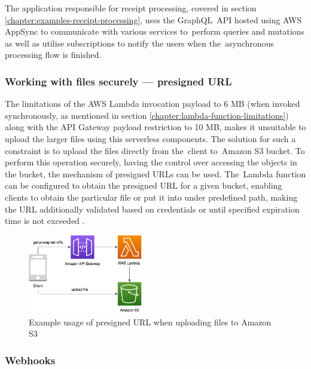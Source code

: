 The application responsible for receipt processing, covered in section \ref{chapter:examples-receipt-processing}, uses the GraphQL~API hosted using AWS AppSync to communicate with various services to~perform queries and mutations as well as utilise subscriptions to notify the users when the~asynchronous processing flow is finished.

\subsubsection{Working with files securely --- presigned URL} \label{chapter:client-presigned-urls}

The limitations of the AWS Lambda invocation payload to 6 MB (when invoked synchronously, as mentioned in section \ref{chapter:lambda-function-limitations}) along with the API Gateway payload restriction to 10 MB, makes it unsuitable to upload the larger files using this serverless components.
The solution for such a constraint is to upload the files directly from the~client to~Amazon S3 bucket.
To perform this operation securely, having the control over accessing the objects in the bucket, the mechanism of presigned URLs can be used.
The~Lambda function can be configured to obtain the presigned URL for a given bucket, enabling clients to obtain the particular file or put it into under predefined path, making the URL additionally validated based on credentials or until specified expiration time is not exceeded \cite{ServerlessAtScaleDesignPatternsAndOptimizations}.

\begin{figure}[h]
   \centering
   \includegraphics[width=0.45\textwidth]{assets/04-serverless-for-web-apps/presignedURL.png}
   \caption{Example usage of presigned URL when uploading files to Amazon S3}
   \label{fig:pattern-presigned-url}
\end{figure}

\subsubsection{Webhooks} \label{chapter:client-webhooks}

